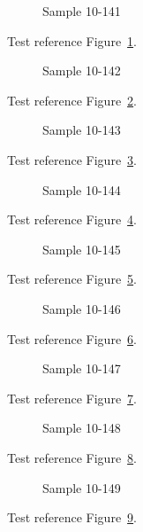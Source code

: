 \begin{figure}[tbhp]
\caption{Sample 10-141}
\label{fig:sample-10-141}
\end{figure}

Test reference Figure~\ref{fig:sample-10-141}.

\begin{figure}[tbhp]
\caption{Sample 10-142}
\label{fig:sample-10-142}
\end{figure}

Test reference Figure~\ref{fig:sample-10-142}.

\begin{figure}[tbhp]
\caption{Sample 10-143}
\label{fig:sample-10-143}
\end{figure}

Test reference Figure~\ref{fig:sample-10-143}.

\begin{figure}[tbhp]
\caption{Sample 10-144}
\label{fig:sample-10-144}
\end{figure}

Test reference Figure~\ref{fig:sample-10-144}.

\begin{figure}[tbhp]
\caption{Sample 10-145}
\label{fig:sample-10-145}
\end{figure}

Test reference Figure~\ref{fig:sample-10-145}.

\begin{figure}[tbhp]
\caption{Sample 10-146}
\label{fig:sample-10-146}
\end{figure}

Test reference Figure~\ref{fig:sample-10-146}.

\begin{figure}[tbhp]
\caption{Sample 10-147}
\label{fig:sample-10-147}
\end{figure}

Test reference Figure~\ref{fig:sample-10-147}.

\begin{figure}[tbhp]
\caption{Sample 10-148}
\label{fig:sample-10-148}
\end{figure}

Test reference Figure~\ref{fig:sample-10-148}.

\begin{figure}[tbhp]
\caption{Sample 10-149}
\label{fig:sample-10-149}
\end{figure}

Test reference Figure~\ref{fig:sample-10-149}.

